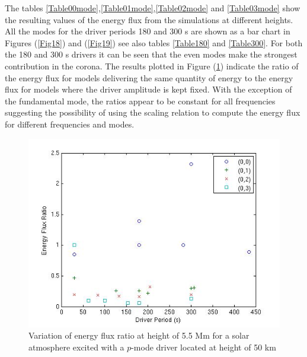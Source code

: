 \documentclass[preprint,authoryear,12pt]{elsarticle}
\begin{document}
The tables \ref{Table00mode},\ref{Table01mode},\ref{Table02mode} and \ref{Table03mode} show the resulting values of the energy flux from the simulations at different heights. All the modes for the driver periods 180 and 300 s are shown as a bar chart in Figures (\ref{Fig18}) and (\ref{Fig19}) see also tables \ref{Table180} and \ref{Table300}. For both the 180 and 300 s drivers it can be seen that the even modes make the strongest contribution in the corona. The results plotted in Figure (\ref{Fig20}) indicate the ratio of the energy flux for models delivering the same quantity of energy to the energy flux for models where the driver amplitude is kept fixed. With the exception of the fundamental mode, the ratios appear to be constant for all frequencies suggesting the possibility of using the scaling relation to compute the energy flux for different frequencies and modes.  
\begin{figure}[h]
\includegraphics[scale=0.6]{imagesn/ratio_varoverconst_eflux_vperiod_for_modes_5p5Mm.jpg}
\caption{Variation of energy flux ratio at height of 5.5 Mm for a solar atmosphere excited with a $p$-mode driver located 
at height of 50 km}
\label{Fig20}
\end{figure}
\end{document}
